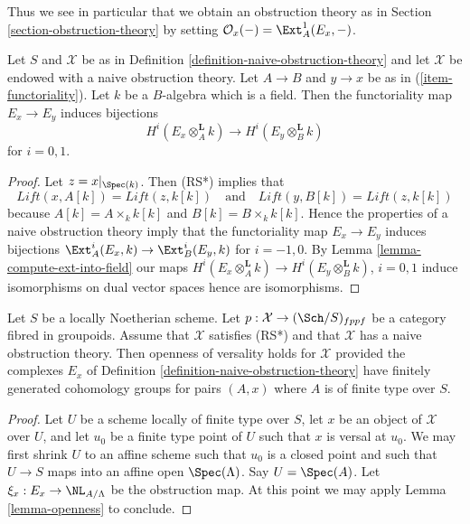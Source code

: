 \noindent
Thus we see in particular that we obtain an obstruction theory
as in Section \ref{section-obstruction-theory} by setting
$\mathcal{O}_x( - ) = \Ext^1_A(E_x, -)$.

\begin{lemma}
\label{lemma-naive-obstruction-theory-qis}
Let $S$ and $\mathcal{X}$ be as in
Definition \ref{definition-naive-obstruction-theory}
and let $\mathcal{X}$ be endowed with a naive obstruction theory.
Let $A \to B$ and $y \to x$ be as in (\ref{item-functoriality}).
Let $k$ be a $B$-algebra which is a field. Then the functoriality
map $E_x \to E_y$ induces bijections
$$
H^i(E_x \otimes_A^{\mathbf{L}} k) \to H^i(E_y \otimes_B^{\mathbf{L}} k)
$$
for $i = 0, 1$.
\end{lemma}

\begin{proof}
Let $z = x|_{\Spec(k)}$. Then (RS*) implies that
$$
\textit{Lift}(x, A[k]) = \textit{Lift}(z, k[k])
\quad\text{and}\quad
\textit{Lift}(y, B[k]) = \textit{Lift}(z, k[k])
$$
because $A[k] = A \times_k k[k]$ and $B[k] = B \times_k k[k]$.
Hence the properties of a naive obstruction theory imply that the
functoriality map $E_x \to E_y$ induces bijections
$\Ext^i_A(E_x, k) \to \Ext^i_B(E_y, k)$
for $i = -1, 0$. By Lemma \ref{lemma-compute-ext-into-field} our maps
$H^i(E_x \otimes_A^{\mathbf{L}} k) \to H^i(E_y \otimes_B^{\mathbf{L}} k)$,
$i = 0, 1$ induce isomorphisms on dual vector spaces hence are isomorphisms.
\end{proof}

\begin{lemma}
\label{lemma-naive-obstruction-theory-gives-openness}
Let $S$ be a locally Noetherian scheme. Let
$p : \mathcal{X} \to (\Sch/S)_{fppf}$ be a category fibred in groupoids.
Assume that $\mathcal{X}$ satisfies (RS*)
and that $\mathcal{X}$ has a naive obstruction theory.
Then openness of versality holds for $\mathcal{X}$ provided the
complexes $E_x$ of Definition \ref{definition-naive-obstruction-theory}
have finitely generated cohomology groups for pairs $(A, x)$ where
$A$ is of finite type over $S$.
\end{lemma}

\begin{proof}
Let $U$ be a scheme locally of finite type over $S$, let $x$ be an object of
$\mathcal{X}$ over $U$, and let $u_0$ be a finite type point of $U$ such that
$x$ is versal at $u_0$. We may first shrink $U$ to an affine scheme such
that $u_0$ is a closed point and such that $U \to S$ maps into an affine
open $\Spec(\Lambda)$. Say $U = \Spec(A)$. Let
$\xi_x : E_x \to \NL_{A/\Lambda}$ be the obstruction map.
At this point we may apply Lemma \ref{lemma-openness} to conclude.
\end{proof}









